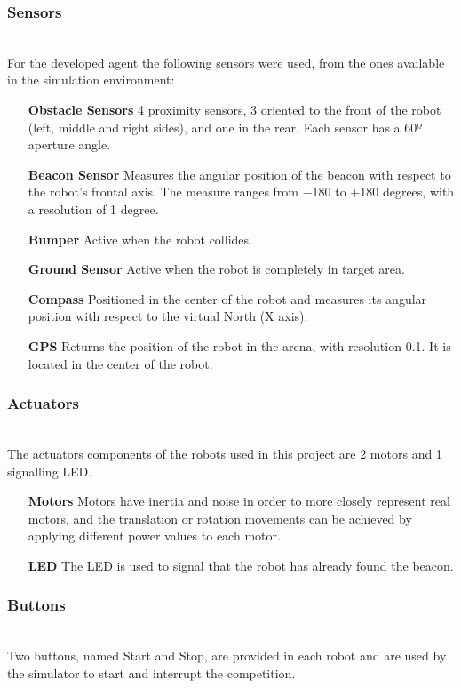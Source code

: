 \documentclass[oribibl]{llncs}
\begin{document}
\subsubsection{Sensors}\hfill \\
For the developed agent the following sensors were used, from the ones available in the simulation environment: 
\begin{itemize}
  \item[\textbf{Obstacle Sensors}]
  4 proximity sensors, 3 oriented to the front of the robot (left, middle and right sides), and one in the rear. Each sensor has a 60º aperture angle.
  \item[\textbf{Beacon Sensor}]
  Measures the angular position of the beacon with respect to the robot’s frontal axis. The measure ranges from −180 to +180 degrees, with a resolution of 1 degree.
  \item[\textbf{Bumper}]Active when the robot collides.
  \item[\textbf{Ground Sensor}]
  Active when the robot is completely in target area.
  \item[\textbf{Compass}]
  Positioned in the center of the robot and measures its angular position with respect to
the virtual North (X axis).
  \item[\textbf{GPS}]
  Returns the position of the robot in the arena, with resolution 0.1. It is located in the center of the robot.
\end{itemize}

\subsubsection{Actuators}\hfill \\
The actuators components of the robots used in this project are 2 motors and 1 signalling LED. 
\begin{itemize}
  \item[\textbf{Motors}]
Motors have inertia and noise in order to more closely represent real motors, and the translation or rotation movements can be achieved by applying different power values to each motor.
  \item[\textbf{LED}]
The LED is used to signal that the robot has already found the beacon.
\end{itemize}

\subsubsection{Buttons}\hfill \\
Two buttons, named Start and Stop, are provided in each robot and are used by the simulator to start and interrupt the competition.
\end{document}
